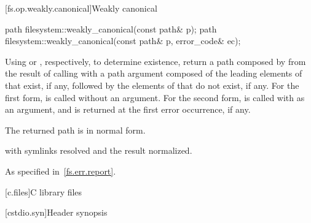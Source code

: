 [fs.op.weakly.canonical]{Weakly canonical}

%
\begin{itemdecl}
path filesystem::weakly_canonical(const path& p);
path filesystem::weakly_canonical(const path& p, error_code& ec);
\end{itemdecl}

\begin{itemdescr}
\pnum
\effects
Using  or , respectively,
  to determine existence,
  return a path composed by 
  from the result of calling 
  with a path argument composed of
  the leading elements of  that exist, if any, followed by
  the elements of  that do not exist, if any.
  For the first form,
   is called without an  argument.
  For the second form,
   is called
  with  as an  argument, and
   is returned at the first error occurrence, if any.

\pnum
\ensures
The returned path is in normal form.

\pnum
\returns
{} with symlinks resolved and
  the result normalized.

\pnum
\throws
As specified in~\ref{fs.err.report}.
\end{itemdescr}

[c.files]{C library files}

[cstdio.syn]{Header  synopsis}

